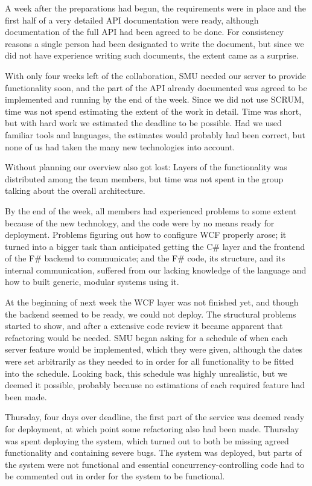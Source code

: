 A week after the preparations had begun, the requirements were in place and the first half of a very detailed API documentation were ready, although documentation of the full API had been agreed to be done. For consistency reasons a single person had been designated to write the document, but since we did not have experience writing such documents, the extent came as a surprise.

With only four weeks left of the collaboration, SMU needed our server to provide functionality soon, and the part of the API already documented was agreed to be implemented and running by the end of the week. Since we did not use SCRUM, time was not spend estimating the extent of the work in detail. Time was short, but with hard work we estimated the deadline to be possible.
Had we used familiar tools and languages, the estimates would probably had been correct, but none of us had taken the many new technologies into account.

Without planning our overview also got lost: Layers of the functionality was distributed among the team members, but time was not spent in the group talking about the overall architecture.

By the end of the week, all members had experienced problems to some extent because of the new technology, and the code were by no means ready for deployment.
Problems figuring out how to configure WCF properly arose; it turned into a bigger task than anticipated getting the C\# layer and the frontend of the F\# backend to communicate; and the F\# code, its structure, and its internal communication, suffered from our lacking knowledge of the language and how to built generic, modular systems using it.

At the beginning of next week the WCF layer was not finished yet, and though the backend seemed to be ready, we could not deploy. The structural problems started to show, and after a extensive code review it became apparent that refactoring would be needed.
SMU began asking for a schedule of when each server feature would be implemented, which they were given, although the dates were set arbitrarily as they needed to in order for all functionality to be fitted into the schedule. Looking back, this schedule was highly unrealistic, but we deemed it possible, probably because no estimations of each required feature had been made.

Thursday, four days over deadline, the first part of the service was deemed ready for deployment, at which point some refactoring also had been made. Thursday was spent deploying the system, which turned out to both be missing agreed functionality and containing severe bugs. The system was deployed, but parts of the system were not functional and essential concurrency-controlling code had to be commented out in order for the system to be functional.

